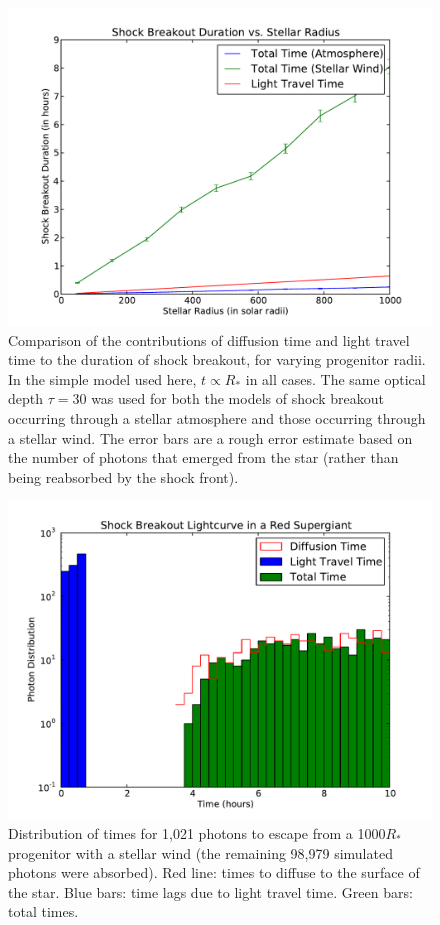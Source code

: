\documentclass{amsart}
\begin{document}
\begin{figure}[h]
  \begin{center}
     \includegraphics[width=\textwidth]{breakout}
  \end{center}
  \caption{Comparison of the contributions of diffusion time and light travel time to the duration of shock breakout, for varying progenitor radii.  In the simple model used here, $t{\propto}R_*$ in all cases.  The same optical depth $\tau=30$ was used for both the models of shock breakout occurring through a stellar atmosphere and those occurring through a stellar wind.  The error bars are a rough error estimate based on the number of photons that emerged from the star (rather than being reabsorbed by the shock front).}
\label{fig:breakout}
\end{figure}

\begin{figure}[h]
  \begin{center}
     \includegraphics[width=\textwidth]{rsg}
  \end{center}
  \caption{Distribution of times for 1,021 photons to escape from a 1000$R_*$ progenitor with a stellar wind (the remaining 98,979 simulated photons were absorbed).  Red line: times to diffuse to the surface of the star.  Blue bars: time lags due to light travel time.  Green bars: total times.}
\label{fig:rsg}
\end{figure}
\end{document}
